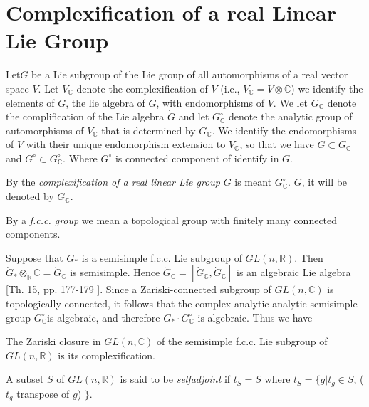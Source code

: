 
\chapter{Complexification of a real Linear Lie Group}\label{chap1} %

Let\pageoriginale $G$ be a Lie subgroup of the Lie group of all automorphisms of a
real vector space $V$. Let $V_{\mathbb{C}}$ denote the
complexification of $V$ (i.e., $V_{\mathbb{C}}= V \otimes \mathbb{C}$)
we identify the elements of $\dot{G}$, the lie algebra of $G$, with
endomorphisms of $V$. We let $\dot{G}_{\mathbb{C}}$ denote the
complification of the Lie algebra $\dot{G}$ and let
$G^\circ_{\mathbb{C}}$ denote the analytic group of automorphisms of
$V_{\mathbb{C}}$ that is determined by $\dot{G}_{\mathbb{C}}$. We identify
the endomorphisms of $V$ with their unique endomorphism extension to
$V_{\mathbb{C}}$, so that we have $\dot{G} \subset
\dot{G}_{\mathbb{C}}$ and $G^\circ \subset
G^\circ_{\mathbb{C}}$. Where $G^\circ$ is connected component of
identify in $G$. 

\begin{defis*}
  By the \textit{complexification of a real linear Lie group} $G$ is
  meant $G^\circ_{\mathbb{C}}$. $G$, it will be denoted by $G_{\mathbb{C}}$.
\end{defis*}

By a \textit{f.c.c. group} we mean a topological group with finitely
many connected components.

Suppose that $G_*$ is a semisimple f.c.c. Lie subgroup of $GL (n,
\mathbb{R})$. Then $\dot{G}_*
\otimes_{\mathbb{R}}\mathbb{C}=\dot{G}_{\mathbb{C}}$ is
semisimple. Hence $\dot{G}_\mathbb{C}=[\dot{G}_{\mathbb{C}},
  \dot{G}_{\mathbb{C}}]$ is an algebraic Lie algebra [Th. 15,
  pp. 177-179 \cite{5}]. Since a Zariski-connected subgroup of $GL(n,
\mathbb{C})$ is topologically connected, it follows that the complex
analytic analytic semisimple group $G^\circ_{\mathbb{C}}$is algebraic,
and therefore $G_* \cdot G^\circ_{\mathbb{C}}$ is algebraic. Thus we
have

\begin{thm} \label{chap1:thm1.1} %
  The Zariski closure in $GL(n, \mathbb{C})$ of the semisimple
  f.c.c. Lie subgroup of $GL (n, \mathbb{R})$ is its
  complexification. 
\end{thm}

\begin{defi*}
  A subset $S$ of $GL(n, \mathbb{R})$ is said to be
  \textit{selfadjoint} if $t_S=S$ where $t_S= \{ g\big| t_g
  \in S$, ($t_g$ transpose of $g$) $\}$.
\end{defi*}

